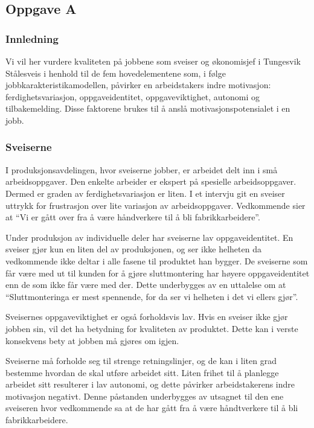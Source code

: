 

\subsection{Oppgave A}
\subsubsection{Innledning}
Vi vil her vurdere kvaliteten på jobbene som sveiser og økonomisjef i Tungesvik Stålesveis i henhold til de fem hovedelementene som, i følge jobbkarakteristikamodellen, påvirker en arbeidstakers indre motivasjon: ferdighetsvariasjon, oppgaveidentitet, oppgaveviktighet, autonomi og tilbakemelding. Disse faktorene brukes til å anslå motivasjonspotensialet i en jobb.

\subsubsection{Sveiserne}
I produksjonsavdelingen, hvor sveiserne jobber, er arbeidet delt inn i små arbeidsoppgaver.
Den enkelte arbeider er ekspert på spesielle arbeidsoppgaver.
Dermed er graden av ferdighetsvariasjon er liten.
I et intervju git en sveiser uttrykk for frustrasjon over lite variasjon av arbeidsoppgaver.
Vedkommende sier at “Vi er gått over fra å være håndverkere til å bli fabrikkarbeidere”.

Under produksjon av individuelle deler har sveiserne lav oppgaveidentitet.
En sveiser gjør kun en liten del av produksjonen, og ser ikke helheten da vedkommende ikke deltar i alle fasene til produktet han bygger.
De sveiserne som får være med ut til kunden for å gjøre sluttmontering har høyere oppgaveidentitet enn de som ikke får være med der.
Dette underbygges av en uttalelse om at “Sluttmonteringa er mest spennende, for da ser vi helheten i det vi ellers gjør”.

Sveisernes oppgaveviktighet er også forholdsvis lav.
Hvis en sveiser ikke gjør jobben sin, vil det ha betydning for kvaliteten av produktet.
Dette kan i verste konsekvens bety at jobben må gjøres om igjen.

Sveiserne må forholde seg til strenge retningslinjer, og de kan i liten grad bestemme hvordan de skal utføre arbeidet sitt.
Liten frihet til å planlegge arbeidet sitt resulterer i lav autonomi, og dette påvirker arbeidstakerens indre motivasjon negativt.
Denne påstanden underbygges av utsagnet til den ene sveiseren hvor vedkommende sa at de har gått fra å være håndtverkere til å bli fabrikkarbeidere.

